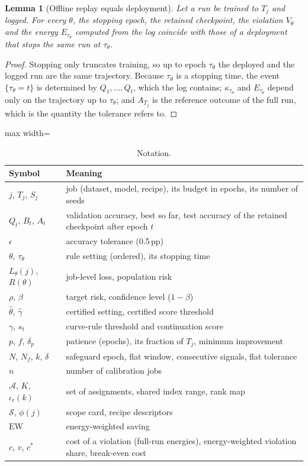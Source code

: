 \documentclass[3p,twocolumn,10pt]{elsarticle}
\newtheorem{lemma}{Lemma}
\theoremstyle{definition}
\begin{document}
\begin{lemma}[Offline replay equals deployment]
\label{lem:replay}
Let a run be trained to $T_j$ and logged. For every $\theta$, the stopping epoch, the retained checkpoint, the violation $V_\theta$ and the energy $E_{\tau_\theta}$ computed from the log coincide with those of a deployment that stops the same run at $\tau_\theta$.
\end{lemma}
\begin{proof}
Stopping only truncates training, so up to epoch $\tau_\theta$ the deployed and the logged run are the same trajectory. Because $\tau_\theta$ is a stopping time, the event $\{\tau_\theta=t\}$ is determined by $Q_1,\dots,Q_t$, which the log contains; $\kappa_{\tau_\theta}$ and $E_{\tau_\theta}$ depend only on the trajectory up to $\tau_\theta$; and $A_{T_j}$ is the reference outcome of the full run, which is the quantity the tolerance refers to.
\end{proof}


\begin{table}[t]
\centering
\caption{Notation.}
\label{tab:symbols}
\footnotesize
\begin{adjustbox}{max width=\columnwidth}
\begin{tabular}{p{1.5cm}p{5.9cm}}
\toprule
Symbol & Meaning \\
\midrule
$j$, $T_j$, $S_j$ & job (dataset, model, recipe), its budget in epochs, its number of seeds \\
$Q_t$, $B_t$, $A_t$ & validation accuracy, best so far, test accuracy of the retained checkpoint after epoch $t$ \\
$\epsilon$ & accuracy tolerance (0.5\,pp) \\
$\theta$, $\tau_\theta$ & rule setting (ordered), its stopping time \\
$L_\theta(j)$, $R(\theta)$ & job-level loss, population risk \\
$\rho$, $\beta$ & target risk, confidence level ($1-\beta$) \\
$\hat\theta$, $\hat\gamma$ & certified setting, certified score threshold \\
$\gamma$, $s_t$ & curve-rule threshold and continuation score \\
$p$, $f$, $\delta_p$ & patience (epochs), its fraction of $T_j$, minimum improvement \\
$N$, $N_f$, $k$, $\delta$ & safeguard epoch, flat window, consecutive signals, flat tolerance \\
$n$ & number of calibration jobs \\
$\mathcal{A}$, $K$, $\iota_r(k)$ & set of assignments, shared index range, rank map \\
$\mathcal{S}$, $\phi(j)$ & scope card, recipe descriptors \\
$\mathrm{EW}$ & energy-weighted saving \\
$c$, $v$, $c^\ast$ & cost of a violation (full-run energies), energy-weighted violation share, break-even cost \\
\bottomrule
\end{tabular}
\end{adjustbox}
\end{table}
\end{document}
